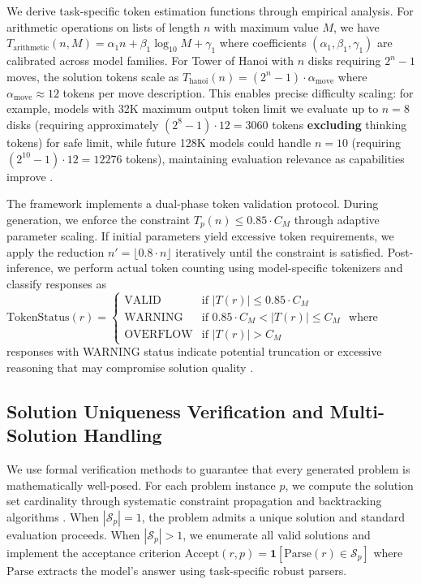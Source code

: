 \documentclass{article} %
\theoremstyle{plain}
\theoremstyle{definition}
\begin{document}
We derive task-specific token estimation functions through empirical analysis. For arithmetic operations on lists of length $n$ with maximum value $M$, we have $T_{\text{arithmetic}}(n, M) = \alpha_1 n + \beta_1 \log_{10} M + \gamma_1$ where coefficients $(\alpha_1, \beta_1, \gamma_1)$ are calibrated across model families. For Tower of Hanoi with $n$ disks requiring $2^n - 1$ moves, the solution tokens scale as $T_{\text{hanoi}}(n) = (2^n - 1) \cdot \alpha_{\text{move}}$ where $\alpha_{\text{move}} \approx 12$ tokens per move description. This enables precise difficulty scaling: for example, models with 32K maximum output token limit we evaluate up to $n = 8$ disks (requiring approximately $(2^8 - 1) \cdot 12 = 3060$ tokens \textbf{excluding} thinking tokens) for safe limit, while future 128K models could handle $n = 10$ (requiring $(2^{10} - 1) \cdot 12 = 12276$ tokens), maintaining evaluation relevance as capabilities improve \citep{wen2025budgetthinkerempoweringbudgetawarellm}.

The framework implements a dual-phase token validation protocol. During generation, we enforce the constraint $T_p(n) \leq 0.85 \cdot C_M$ through adaptive parameter scaling. If initial parameters yield excessive token requirements, we apply the reduction $n' = \lfloor 0.8 \cdot n \rfloor$ iteratively until the constraint is satisfied. Post-inference, we perform actual token counting using model-specific tokenizers and classify responses as $\text{TokenStatus}(r) = \begin{cases} \text{VALID} & \text{if } |T(r)| \leq 0.85 \cdot C_M \\ \text{WARNING} & \text{if } 0.85 \cdot C_M < |T(r)| \leq C_M \\ \text{OVERFLOW} & \text{if } |T(r)| > C_M \end{cases}$ where responses with WARNING status indicate potential truncation or excessive reasoning that may compromise solution quality \citep{wang2024reasoningtokeneconomiesbudgetaware}.

\subsection{Solution Uniqueness Verification and Multi-Solution Handling}

We use formal verification methods to guarantee that every generated problem is mathematically well-posed. For each problem instance $p$, we compute the solution set cardinality through systematic constraint propagation and backtracking algorithms \citep{bessiere2006constraint}. When $|\mathcal{S}_p| = 1$, the problem admits a unique solution and standard evaluation proceeds. When $|\mathcal{S}_p| > 1$, we enumerate all valid solutions and implement the acceptance criterion $\text{Accept}(r, p) = \mathbf{1}[\text{Parse}(r) \in \mathcal{S}_p]$ where $\text{Parse}$ extracts the model's answer using task-specific robust parsers.
\end{document}
